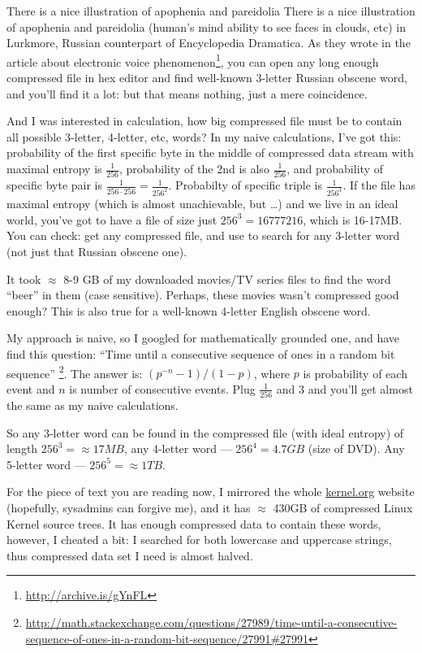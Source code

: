 There is a nice illustration of apophenia and pareidolia
There is a nice illustration of apophenia and pareidolia
(human's mind ability to see faces in clouds, etc) in Lurkmore, Russian counterpart of Encyclopedia Dramatica.
As they wrote in the article about electronic voice phenomenon\footnote{\url{http://archive.is/gYnFL}},
you can open any long enough compressed file in hex editor and find well-known 3-letter Russian obscene word, and you'll find it a lot: but that means nothing, just a mere coincidence.

And I was interested in calculation, how big compressed file must be to contain all possible 3-letter, 4-letter, etc, words?
In my naive calculations, I've got this: probability of the first specific byte in the middle of compressed data stream with maximal entropy is $\frac{1}{256}$, probability of the 2nd is also $\frac{1}{256}$,
and probability of specific byte pair is $\frac{1}{256 \cdot 256} = \frac{1}{256^2}$.
Probabilty of specific triple is $\frac{1}{256^3}$.
If the file has maximal entropy (which is almost unachievable, but \dots) and we live in an ideal world, you've got to have a file of size just $256^3=16777216$, which is 16-17MB.
You can check: get any compressed file, and use  to search for any 3-letter word (not just that Russian obscene one).

It took $\approx$ 8-9 GB of my downloaded movies/TV series files to find the word ``beer'' in them (case sensitive).
Perhaps, these movies wasn't compressed good enough?
This is also true for a well-known 4-letter English obscene word.

My approach is naive, so I googled for mathematically grounded one, and have find this question:
``Time until a consecutive sequence of ones in a random bit sequence''
\footnote{\url{http://math.stackexchange.com/questions/27989/time-until-a-consecutive-sequence-of-ones-in-a-random-bit-sequence/27991#27991}}.
The answer is: $(p^{−n}−1)/(1−p)$, where $p$ is probability of each event and $n$ is number of consecutive events.
Plug $\frac{1}{256}$ and $3$ and you'll get almost the same as my naive calculations.

So any 3-letter word can be found in the compressed file (with ideal entropy) of length $256^3 = \approx 17MB$, any 4-letter word --- $256^4 = 4.7GB$ (size of DVD).
Any 5-letter word --- $256^5 = \approx 1TB$.

For the piece of text you are reading now, I mirrored the whole \href{https://www.kernel.org/}{kernel.org} website (hopefully, sysadmins can forgive me),
and it has $\approx$ 430GB of compressed Linux Kernel source trees.
It has enough compressed data to contain these words, however, I cheated a bit: I searched for both lowercase and uppercase strings, thus compressed data set I need is almost halved.

